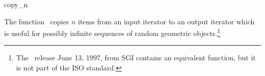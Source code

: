\begin{ccRefFunction}{copy_n}
  \label{sectionCopyN}
  \label{sectionGenericFunctions}

  \ccDefinition The function \ccRefName\ copies $n$ items from an
  input iterator to an output iterator which is useful for possibly
  infinite
  sequences of random geometric objects.\footnote{%
    The \stl\ release June 13, 1997, from SGI contains an equivalent
    function, but it is not part of the ISO standard.}
  
  
  
  \ccSeeAlso
\end{ccRefFunction}

